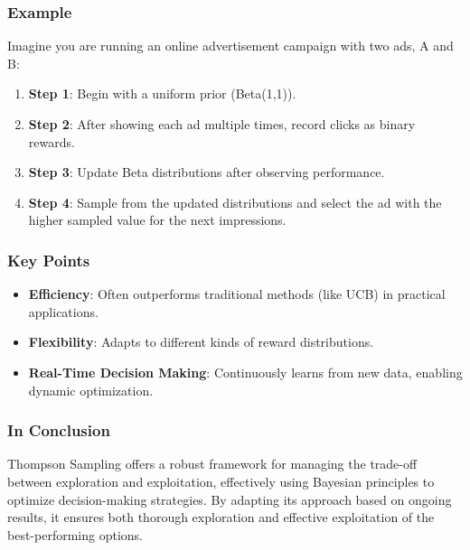 \documentclass[aspectratio=169]{beamer}
\begin{document}
\begin{frame}[fragile]
    \frametitle{Example}
    Imagine you are running an online advertisement campaign with two ads, A and B:

    \begin{enumerate}
        \item \textbf{Step 1}: Begin with a uniform prior (Beta(1,1)).
        \item \textbf{Step 2}: After showing each ad multiple times, record clicks as binary rewards.
        \item \textbf{Step 3}: Update Beta distributions after observing performance.
        \item \textbf{Step 4}: Sample from the updated distributions and select the ad with the higher sampled value for the next impressions.
    \end{enumerate}
\end{frame}

\begin{frame}[fragile]
    \frametitle{Key Points}
    \begin{itemize}
        \item \textbf{Efficiency}: Often outperforms traditional methods (like UCB) in practical applications.
        \item \textbf{Flexibility}: Adapts to different kinds of reward distributions.
        \item \textbf{Real-Time Decision Making}: Continuously learns from new data, enabling dynamic optimization.
    \end{itemize}
\end{frame}

\begin{frame}[fragile]
    \frametitle{In Conclusion}
    Thompson Sampling offers a robust framework for managing the trade-off between exploration and exploitation, effectively using Bayesian principles to optimize decision-making strategies. By adapting its approach based on ongoing results, it ensures both thorough exploration and effective exploitation of the best-performing options.
\end{frame}
\end{document}
